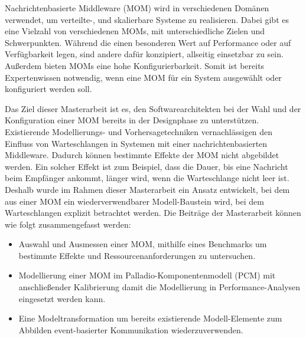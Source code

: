 
\Abstract
Nachrichtenbasierte Middleware (MOM) wird in verschiedenen Domänen verwendet, um verteilte-, und skalierbare Systeme zu realisieren. %
Dabei gibt es eine Vielzahl von verschiedenen MOMs, mit unterschiedliche Zielen und Schwerpunkten. Während die einen besonderen Wert auf Performance oder auf Verfügbarkeit legen, sind andere dafür konzipiert, allseitig einsetzbar zu sein. Außerdem bieten MOMs eine hohe Konfigurierbarkeit. Somit ist bereits Expertenwissen notwendig, wenn eine MOM für ein System ausgewählt oder konfiguriert werden soll. \par 
Das Ziel dieser Masterarbeit ist es, den Softwarearchitekten bei der Wahl und der Konfiguration einer MOM bereits in der Designphase zu unterstützen.
Existierende Modellierungs- und Vorhersagetechniken vernachlässigen den Einfluss von Warteschlangen in Systemen mit einer nachrichtenbasierten Middleware. Dadurch können bestimmte Effekte der MOM nicht abgebildet werden. Ein solcher Effekt ist zum Beispiel, dass die Dauer, bis eine Nachricht beim Empfänger ankommt, länger wird, wenn die Warteschlange nicht leer ist.
Deshalb wurde im Rahmen dieser Masterarbeit ein Ansatz entwickelt, bei dem aus einer MOM ein wiederverwendbarer Modell-Baustein wird, bei dem Warteschlangen explizit betrachtet werden. Die Beiträge der Masterarbeit können wie folgt zusammengefasst werden:
\begin{itemize}
    \item Auswahl und Ausmessen einer MOM, mithilfe eines Benchmarks um bestimmte Effekte und Ressourcenanforderungen zu untersuchen.
    \item Modellierung einer MOM im Palladio-Komponentenmodell (PCM) mit anschließender Kalibrierung damit die Modellierung in Performance-Analysen eingesetzt werden kann.
    \item Eine Modeltransformation um bereits existierende Modell-Elemente zum Abbilden event-basierter Kommunikation wiederzuverwenden.
\end{itemize}
